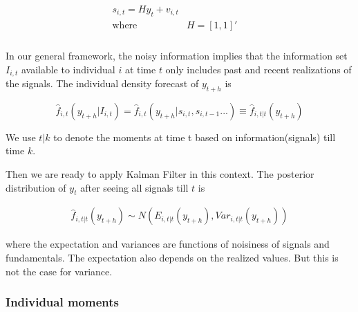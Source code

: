\documentclass[]{article}
\begin{document}
\begin{eqnarray}
\begin{aligned}
s_{i,t} = H y_{t} + v_{i,t} \\
\text{where } & H=[1,1]' \quad \\
\end{aligned}
\end{eqnarray}


In our general framework, the noisy information implies that the information set $I_{i,t}$ available to individual $i$ at time $t$ only includes past and recent realizations of the signals. The individual density forecast of $y_{t+h}$ is

$$\widehat f_{i,t}(y_{t+h}|I_{i,t}) = \widehat  f_{i,t}(y_{t+h}|s_{i,t},s_{i,t-1}...) \equiv \widehat  f_{i,t|t}(y_{t+h})$$


We use $t|k$ to denote the moments at time t based on information(signals) till time $k$. 


Then we are ready to apply Kalman Filter in this context. The posterior distribution of $y_{t}$ after seeing all signals till $t$ is 

\begin{eqnarray}
\widehat  f_{i,t|t}(y_{t+h})  \sim  N(E_{i,t|t}(y_{t+h}), Var_{i,t|t}(y_{t+h}))
\end{eqnarray}

where the expectation and variances are functions of noisiness of signals and fundamentals. The expectation also depends on the realized values. But this is not the case for variance. 

\subsubsection{Individual moments }
\end{document}
